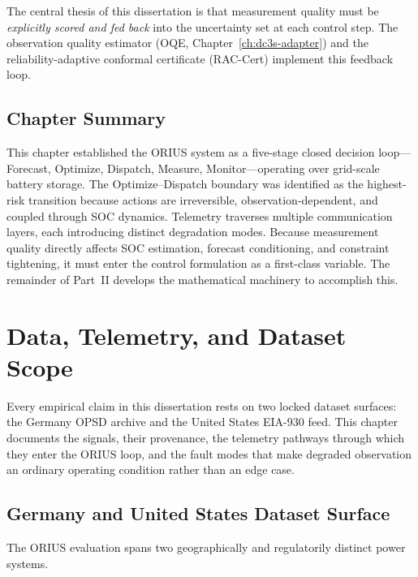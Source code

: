 The central thesis of this dissertation is that measurement quality must be
\emph{explicitly scored and fed back} into the uncertainty set at each control
step.  The observation quality estimator (OQE, Chapter~\ref{ch:dc3s-adapter})
and the reliability-adaptive conformal certificate (RAC-Cert) implement this
feedback loop.

\subsection{Chapter Summary}

This chapter established the ORIUS system as a five-stage closed decision
loop---Forecast, Optimize, Dispatch, Measure, Monitor---operating over
grid-scale battery storage.  The Optimize--Dispatch boundary was identified as
the highest-risk transition because actions are irreversible, observation-dependent,
and coupled through SOC dynamics.  Telemetry traverses multiple communication
layers, each introducing distinct degradation modes.  Because measurement
quality directly affects SOC estimation, forecast conditioning, and constraint
tightening, it must enter the control formulation as a first-class variable.
The remainder of Part~II develops the mathematical machinery to accomplish this.



\section{Data, Telemetry, and Dataset Scope}
\label{ch:data-telemetry}

Every empirical claim in this dissertation rests on two locked dataset
surfaces: the Germany OPSD archive and the United States EIA-930 feed.  This
chapter documents the signals, their provenance, the telemetry pathways
through which they enter the ORIUS loop, and the fault modes that make
degraded observation an ordinary operating condition rather than an edge case.

\subsection{Germany and United States Dataset Surface}

The ORIUS evaluation spans two geographically and regulatorily distinct
power systems.


